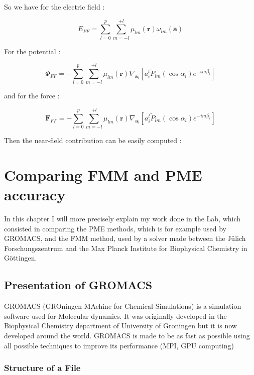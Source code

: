 \documentclass[10pt,twoside,a4paper]{report}
\begin{document}
   
   So we have for the electric field :
      
   \begin{equation}
   E_{FF} = \sum\limits_{l=0}^{p} \sum\limits_{m=-l}^{+l} \mu_{lm}(\textbf{r}) \omega_{lm}(\textbf{a})
   \end{equation}
   
   For the potential :
 
 	\begin{equation}
   \Phi_{FF} = - \sum\limits_{l=0}^{p} \sum\limits_{m=-l}^{+l} \mu_{lm}(\textbf{r}) \nabla_{\textbf{a}_i}[a_i^l \widetilde{P}_{lm}(\cos\alpha_i)e^{-im\beta_i}]
   \end{equation}
   
   and for the force :
   
   \begin{equation}
   \textbf{F}_{FF} = - \sum\limits_{l=0}^{p} \sum\limits_{m=-l}^{+l} \mu_{lm}(\textbf{r}) \nabla_{\textbf{a}_i}[a_i^l \widetilde{P}_{lm}(\cos\alpha_i)e^{-im\beta_i}]
   \end{equation}
   
 Then the near-field contribution can be easily computed : 

 

\chapter{Comparing FMM and PME accuracy}

    In this chapter I will more precisely explain my work done in the Lab, which consisted in comparing the PME methods, which is for example used by GROMACS, and the FMM method, used by a solver made between the Jülich Forschungszentrum and the Max Planck Institute for Biophysical Chemistry in Göttingen.

  


\section{Presentation of GROMACS}

    GROMACS (GROningen MAchine for Chemical Simulations) is a simulation software used for Molecular dynamics. It was originally developed in the Biophysical Chemistry department of University of Groningen but it is now developed around the world. GROMACS is made to be as fast as possible using all possible techniques to improve its performance (MPI, GPU computing) 
    
   
	\subsection{Structure of a File}
	
\end{document}
